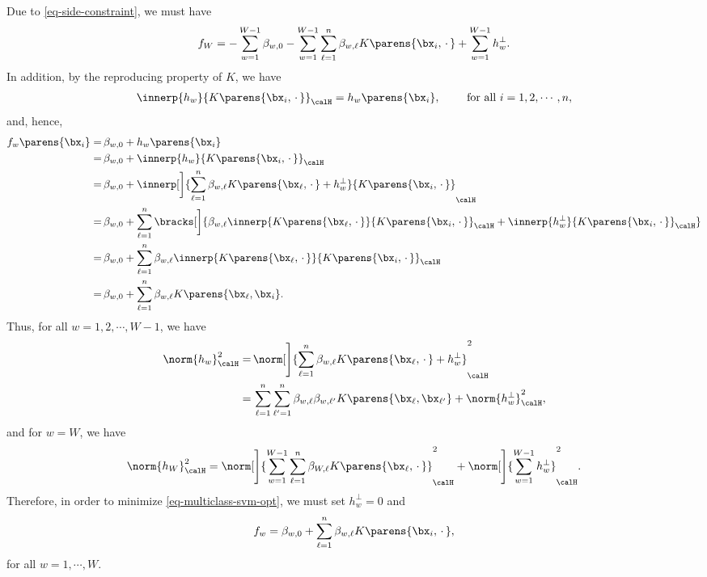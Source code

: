 \documentclass[12pt]{article}
\begin{document}
\begin{enumerate}[label=\textbf{\arabic*.}]
\begin{enumerate}
		Due to \eqref{eq-side-constraint}, we must have 
		\begin{align*}
			f_W = - \sum_{w=1}^{W-1} \beta_{w,0} - \sum_{w=1}^{W-1} \sum_{\ell=1}^n \beta_{w, \ell} K \parens{\bx_i, \,\cdot\,} + \sum_{w=1}^{W-1} h_w^{\perp}. 
		\end{align*}
		In addition, by the reproducing property of $K$, we have 
		\begin{align*}
			\innerp{h_w}{ K \parens{\bx_i, \,\cdot\,}}_{\calH} = h_w \parens{\bx_i}, \qquad \text{ for all } i = 1, 2, \cdots, n, 
		\end{align*}
		and, hence, 
		\begin{align*}
			f_w \parens{\bx_i} = & \, \beta_{w, 0} + h_w \parens{\bx_i} \\ 
			= & \, \beta_{w, 0} + \innerp{h_w}{K \parens{\bx_i, \,\cdot\,}}_{\calH} \\ 
			= & \, \beta_{w, 0} + \innerp[\bigg]{\sum_{\ell=1}^n \beta_{w, \ell} K \parens{\bx_{\ell}, \,\cdot\,} + h_w^{\perp}}{K \parens{\bx_i, \,\cdot\,}}_{\calH} \\ 
			= & \, \beta_{w, 0} + \sum_{\ell=1}^n \bracks[\bigg]{\beta_{w, \ell} \innerp{ K \parens{\bx_{\ell}, \,\cdot\,}}{K \parens{\bx_i, \,\cdot\,}}_{\calH} + \innerp{h_w^{\perp}}{K \parens{\bx_i, \,\cdot\,}}_{\calH} } \\ 
			= & \, \beta_{w, 0} + \sum_{\ell=1}^n \beta_{w, \ell} \innerp{ K \parens{\bx_{\ell}, \,\cdot\,}}{K \parens{\bx_i, \,\cdot\,}}_{\calH} \\ 
			= & \, \beta_{w, 0} + \sum_{\ell=1}^n \beta_{w, \ell} K \parens{\bx_{\ell}, \bx_i}. 
		\end{align*}
		Thus, for all $w = 1, 2, \cdots, W-1$, we have 
		\begin{align*}
			\norm{h_w}_{\calH}^2 = & \, \norm[\Bigg]{\sum_{\ell=1}^n \beta_{w, \ell} K \parens{\bx_{\ell}, \,\cdot\,} + h_w^{\perp}}_{\calH}^2 \\ 
			= & \, \sum_{\ell=1}^n \sum_{\ell'=1}^n \beta_{w, \ell} \beta_{w, \ell'} K \parens{\bx_{\ell}, \bx_{\ell'}} + \norm{h_w^{\perp}}_{\calH}^2, 
		\end{align*}
		and for $w = W$, we have 
		\begin{align*}
			\norm{h_W}_{\calH}^2 = \norm[\Bigg]{\sum_{w=1}^{W-1} \sum_{\ell=1}^n \beta_{W, \ell} K \parens{\bx_{\ell}, \,\cdot\,} }_{\calH}^2 + \norm[\Bigg]{\sum_{w=1}^{W-1} h_w^{\perp}}_{\calH}^2. 
		\end{align*}
		Therefore, in order to minimize \eqref{eq-multiclass-svm-opt}, we must set $h_w^{\perp} = 0$ and 
		\begin{align*}
			f_w = \beta_{w, 0} + \sum_{\ell=1}^n \beta_{w,\ell} K \parens{\bx_i, \,\cdot\,}, 
		\end{align*}
		for all $w = 1, \cdots, W$. 
		

\end{enumerate}
\end{enumerate}
\end{document}
